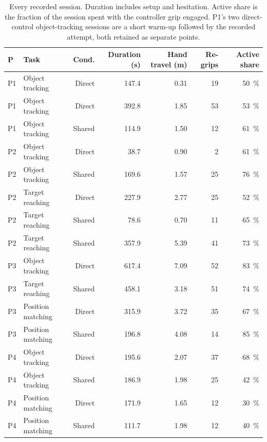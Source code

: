 \begin{table}[htbp]
  \centering
  \small
  \caption[Every pilot session]{Every recorded session. Duration includes
  setup and hesitation. Active share is the fraction of the session spent
  with the controller grip engaged. P1's two direct-control object-tracking
  sessions are a short warm-up followed by the recorded attempt, both
  retained as separate points.}
  \label{tab:pilot-sessions}
  \begin{tabular}{@{}llrrrrr@{}}
    \toprule
    P & Task & Cond. & Duration (s) & Hand travel (m) & Re-grips & Active share \\
    \midrule
    P1 & Object tracking & Direct & 147.4 & 0.31 & 19 & \SI{50}{\percent} \\
    P1 & Object tracking & Direct & 392.8 & 1.85 & 53 & \SI{53}{\percent} \\
    P1 & Object tracking & Shared & 114.9 & 1.50 & 12 & \SI{61}{\percent} \\
    P2 & Object tracking & Direct & 38.7  & 0.90 & 2  & \SI{61}{\percent} \\
    P2 & Object tracking & Shared & 169.6 & 1.57 & 25 & \SI{76}{\percent} \\
    P2 & Target reaching & Direct & 227.9 & 2.77 & 25 & \SI{52}{\percent} \\
    P2 & Target reaching & Shared & 78.6  & 0.70 & 11 & \SI{65}{\percent} \\
    P2 & Target reaching & Shared & 357.9 & 5.39 & 41 & \SI{73}{\percent} \\
    P3 & Object tracking & Direct & 617.4 & 7.09 & 52 & \SI{83}{\percent} \\
    P3 & Target reaching & Shared & 458.1 & 3.18 & 51 & \SI{74}{\percent} \\
    P3 & Position matching & Direct & 315.9 & 3.72 & 35 & \SI{67}{\percent} \\
    P3 & Position matching & Shared & 196.8 & 4.08 & 14 & \SI{85}{\percent} \\
    P4 & Object tracking & Direct & 195.6 & 2.07 & 37 & \SI{68}{\percent} \\
    P4 & Object tracking & Shared & 186.9 & 1.98 & 25 & \SI{42}{\percent} \\
    P4 & Position matching & Direct & 171.9 & 1.65 & 12 & \SI{30}{\percent} \\
    P4 & Position matching & Shared & 111.7 & 1.98 & 12 & \SI{40}{\percent} \\
    \bottomrule
  \end{tabular}
\end{table}

